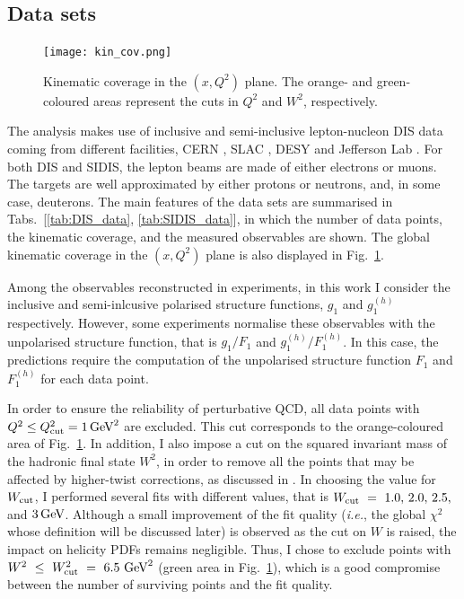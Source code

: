 \subsection{Data sets}
\begin{figure}[t]
  \centering
  \texttt{[image: kin\_cov.png]} 
  \caption{\small{Kinematic coverage in the $(x,Q^2)$ plane. The orange- and green-coloured areas represent the cuts in $Q^2$ and $W^2$, respectively.}}
  \label{fig:kin_cov}
\end{figure}
The analysis makes use of inclusive and semi-inclusive lepton-nucleon DIS data coming from different facilities, CERN \cite{EuropeanMuon:1989yki, SpinMuon:1999udj, COMPASS:2006mhr, COMPASS:2010wkz, COMPASS:2010hwr}, SLAC \cite{E142:1996thl, E143:1998hbs, E154:1997xfa, E155:2000qdr}, DESY \cite{HERMES:2018awh, HERMES:2006jyl, HERMES:1997hjr} and Jefferson Lab \cite{Kramer:2002tt, JeffersonLabHallA:2004tea, CLAS:2014qtg}. For both DIS and SIDIS, the lepton beams are made of either electrons or muons. The targets are well approximated  by either protons or neutrons, and, in some case, deuterons. The main features of the data sets are summarised in Tabs.~[\ref{tab:DIS_data}, \ref{tab:SIDIS_data}], in which the number of data points, the kinematic coverage, and the measured observables are shown. The global kinematic coverage in the $(x,Q^2)$ plane is also displayed in Fig.~\ref{fig:kin_cov}. \par
Among the observables reconstructed in experiments, in this work I consider the inclusive and semi-inlcusive polarised structure functions, $g_1$ and $g_1^{(h)}$ respectively. However, some experiments normalise these observables with the unpolarised structure function, that is $g_1/F_1$ and $g_1^{(h)}/F_1^{(h)}$. In this case, the predictions require the computation of the unpolarised structure function $F_1$ and $F_1^{(h)}$ for each data point. %

In order to ensure the reliability of perturbative QCD, all data points with $Q^2 \leq Q^2_{\textrm{cut}} = 1 \, \textrm{GeV}^2$ are excluded. This cut corresponds to the orange-coloured area of Fig.~\ref{fig:kin_cov}. In addition, I also impose a cut on the squared invariant mass of the hadronic final state $W^2$, in order to remove all the points that may be affected by higher-twist corrections, as discussed in . In choosing the value for $W_{\textrm{cut}}$, I performed several fits with different values, that is $W_{\textrm{cut}}~=~1.0, \, 2.0, \, 2.5,$ and $3 \, \textrm{GeV}$. Although a small improvement of the fit quality (\textit{i.e.}, the global $\chi^2$ whose definition will be discussed later) is observed as the cut on $W$ is raised, the impact on helicity PDFs remains negligible. Thus, I chose to exclude points with $W^2~\leq~W^2_{\textrm{cut}}~=~6.5~\textrm{GeV}^2$ (green area in Fig.~\ref{fig:kin_cov}), which is a good compromise between the number of surviving points and the fit quality.%

